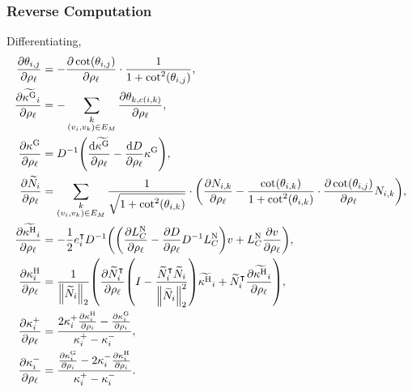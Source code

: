 \subsubsection{Reverse Computation}
Differentiating, \begin{align*}
	\frac{\partial\theta_{i, j}}{\partial\rho_\ell} &= -\frac{\partial\cot\pof{\theta_{i, j}}}{\partial \rho_\ell} \cdot \frac{1}{1 + \cot^2\pof{\theta_{i, j}}}, \\
	\frac{\partial\widetilde{\kappa^\text{G}}_i}{\partial\rho_\ell} &= -\sum_{\substack{k \\ \pof{v_i, v_k} \in E_M}} \frac{\partial\theta_{k, c\pof{i, k}}}{\partial\rho_\ell}, \\
	\frac{\partial\kappa^\text{G}}{\partial\rho_\ell} &= D^{-1}\pof{\frac{\dif\widetilde{\kappa^\text{G}}}{\partial\rho_\ell} - \frac{\dif D}{\partial\rho_\ell}\kappa^\text{G}}, \\
	\frac{\partial\widetilde{N}_i}{\partial\rho_\ell} &= \sum_{\substack{k \\ \pof{v_i, v_k} \in E_M}} \frac{1}{\sqrt{1 + \cot^2\pof{\theta_{i, k}}}} \cdot \pof{\frac{\partial N_{i, k}}{\partial\rho_\ell} - \frac{\cot\pof{\theta_{i, k}}}{1 + \cot^2\pof{\theta_{i, k}}} \cdot \frac{\partial\cot\pof{\theta_{i, j}}}{\partial \rho_\ell}N_{i, k}}, \\
	\frac{\partial\widetilde{\kappa^\text{H}}_i}{\partial\rho_\ell} &= -\frac{1}{2}e_i^\intercal D^{-1}\pof{\pof{\frac{\partial L_C^{\text{N}}}{\partial\rho_\ell} - \frac{\partial D}{\partial\rho_\ell}D^{-1}L_C^{\text{N}}}v + L_C^{\text{N}}\frac{\partial v}{\partial\rho_\ell}}, \\
	\frac{\partial\kappa_i^\text{H}}{\partial\rho_\ell} &= \frac{1}{\norm{\widetilde{N}_i}_2}\pof{\frac{\partial\widetilde{N}_i^\intercal}{\partial\rho_\ell}\pof{I - \frac{\widetilde{N}_i^\intercal\widetilde{N}_i}{\norm{\widetilde{N}_i}_2^2}}\widetilde{\kappa^\text{H}}_i + \widetilde{N}_i^\intercal\frac{\partial\widetilde{\kappa^\text{H}}_i}{\partial\rho_\ell}}, \\
	\frac{\partial\kappa^+_i}{\partial\rho_\ell} &= \frac{2\kappa^+_i\frac{\partial\kappa^{\text{H}}_i}{\partial\rho_i} - \frac{\partial\kappa^{\text{G}}_i}{\partial\rho_i}}{\kappa^+_i - \kappa^-_i}, \\
	\frac{\partial\kappa^-_i}{\partial\rho_\ell} &= \frac{\frac{\partial\kappa^{\text{G}}_i}{\partial\rho_i} - 2\kappa^-_i\frac{\partial\kappa^{\text{H}}_i}{\partial\rho_i}}{\kappa^+_i - \kappa^-_i}.
\end{align*}
